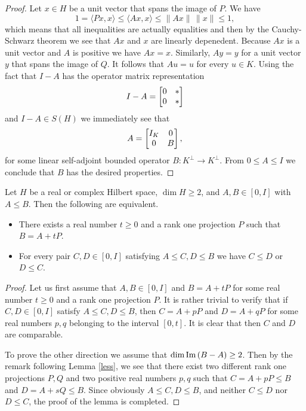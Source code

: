 \documentclass{article}
\begin{document}
\begin{proof}
Let $x\in H$ be a unit vector that spans the image of $P$. We have
$$
1 = \langle Px , x \rangle \le  \langle Ax , x \rangle \le \| Ax\| \, \|x \| \le 1,
$$
which means that all inequalities are actually equalities and then by the Cauchy-Schwarz theorem we see that $Ax$ and $x$ are linearly depenedent. Because $Ax$ is a unit vector and $A$ is positive we have $Ax=x$. Similarly, $Ay = y$ for a unit vector $y$ that spans the image of $Q$. It follows that $Au=u$ for every $u \in K$. Using the fact that $I-A$ has the operator matrix representation
$$
I - A = \left[ \begin{matrix} 0 & * \cr 0 & * \cr \end{matrix} \right]
$$ 
and $I-A \in S(H)$ we immediately see that
$$
A = \left[ \begin{matrix} I_K & 0 \cr 0 & B \cr \end{matrix} \right],
$$
for some linear self-adjoint bounded operator $B :  K^\perp \to K^\perp$. From $0 \le A \le I$ we conclude that $B$ has the desired properties.
\end{proof}

\begin{lemma}\label{rkone}
Let $H$ be a real or complex Hilbert space, $\dim H \ge 2$, and $A,B \in [0,I]$ with $A \le B$. Then the following are equivalent.
\begin{itemize}
\item There exists a real number $t \ge 0$ and a rank one projection $P$ such that $B = A +tP$.
\item For every pair $C,D \in [0,I]$ satisfying $A \le C,D \le B$ we have $C \le D$ or $D \le C$.
\end{itemize}
\end{lemma}

\begin{proof}
Let us first assume that $A,B \in [0,I]$ and $B = A +tP$ for some real number $t \ge 0$ and a rank one projection $P$.
It is rather trivial to verify that if $C,D \in [0,I]$ satisfy $A \le C,D \le B$, then $C = A+ pP$ and $D= A+qP$ for some real numbers $p,q$ belonging to the interval $[0,t]$. It is clear that then $C$ and $D$ are comparable.

To prove the other direction we assume that $\dim {\rm Im}\, (B-A) \ge 2$. Then by the remark following Lemma \ref{less}, we see that  there exist two different rank one projections $P,Q$ and two positive real numbers $p,q$ such that $C = A + pP \le B$ and $D = A+sQ \le B$. Since obviously $A \le C,D \le B$, and neither $C \le D$ nor $D\le C$, the proof of the lemma is completed. 
\end{proof}
\end{document}
